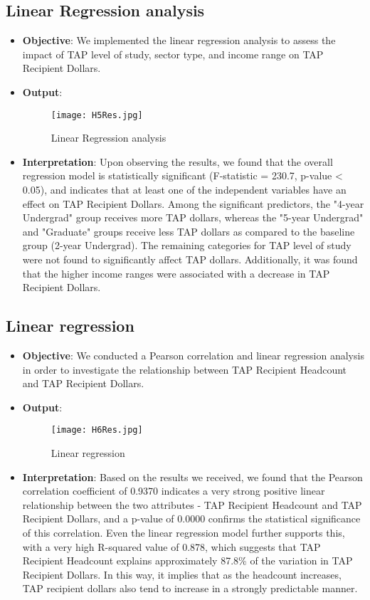 \documentclass[sigconf]{acmart}
\begin{document}
\subsection{Linear Regression analysis}
\begin{itemize}
    \item \textbf{Objective}: We implemented the linear regression analysis to assess the impact of TAP level of study, sector type, and income range on TAP Recipient Dollars.
    \item \textbf{Output}:
    \begin{figure}[h] 
    \centering
    \texttt{[image: H5Res.jpg]} 
    \caption{Linear Regression analysis} 
    \label{fig:data_testing} 
    \end{figure}
    \item \textbf{Interpretation}:
    Upon observing the results, we found that the overall regression model is statistically significant (F-statistic = 230.7, p-value < 0.05), and indicates that at least one of the independent variables have an effect on TAP Recipient Dollars. Among the significant predictors, the "4-year Undergrad" group receives more TAP dollars, whereas the "5-year Undergrad" and "Graduate" groups receive less TAP dollars as compared to the baseline group (2-year Undergrad). The remaining categories for TAP level of study were not found to significantly affect TAP dollars. Additionally, it was found that the higher income ranges were associated with a decrease in TAP Recipient Dollars.
\end{itemize}

\subsection{Linear regression}
\begin{itemize}
    \item \textbf{Objective}: We conducted a Pearson correlation and linear regression analysis in order to investigate the relationship between TAP Recipient Headcount and TAP Recipient Dollars.
    \item \textbf{Output}:
    \begin{figure}[h] 
    \centering
    \texttt{[image: H6Res.jpg]} 
    \caption{Linear regression} 
    \label{fig:data_testing} 
    \end{figure}
    \item \textbf{Interpretation}: Based on the results we received, we found that the Pearson correlation coefficient of 0.9370 indicates a very strong positive linear relationship between the two attributes - TAP Recipient Headcount and TAP Recipient Dollars, and a p-value of 0.0000 confirms the statistical significance of this correlation. Even the linear regression model further supports this, with a very high R-squared value of 0.878, which suggests that TAP Recipient Headcount explains approximately 87.8\% of the variation in TAP Recipient Dollars. In this way, it implies that as the headcount increases, TAP recipient dollars also tend to increase in a strongly predictable manner.

\end{itemize}
\end{document}
